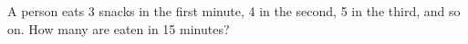 A person eats 3 snacks in the first minute, 4 in the second, 5 in the third, and so on. How many are eaten in 15 minutes?

